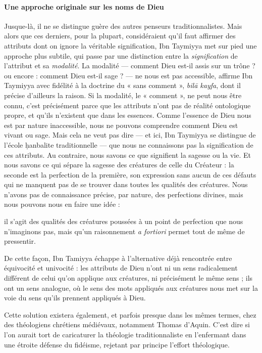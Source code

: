 \paragraph{Une approche originale sur les noms de Dieu}Jusque-là, il ne se distingue guère des autres penseurs
traditionnalistes. Mais alors que ces derniers, pour la plupart,
considéraient qu'il faut affirmer des attributs dont on ignore la
véritable signification, Ibn Taymiyya met sur pied une approche plus
subtile, qui passe par une distinction entre la \emph{signification} de
l'attribut et sa \emph{modalité}. La modalité --- comment Dieu est-il
assis sur un trône ? ou encore : comment Dieu est-il sage ? --- ne nous
est pas accessible, affirme Ibn Taymiyya avec fidélité à la doctrine du
« sans comment », \emph{bilā kayfa}, dont il précise d'ailleurs la
raison. Si la modalité, le « comment », ne peut nous être connu, c'est
précisément parce que les attributs n'ont pas de réalité ontologique
propre, et qu'ils n'existent que dans les essences. Comme l'essence de
Dieu nous est par nature inaccessible, nous ne pouvons comprendre
comment Dieu est vivant ou sage. Mais cela ne veut pas dire --- et ici,
Ibn Taymiyya se distingue de l'école ḥanbalite traditionnelle --- que
nous ne connaissons pas la signification de ces attributs. Au contraire,
nous savons ce que signifient la sagesse ou la vie. Et nous savons ce
qui sépare la sagesse des créatures de celle du Créateur : la seconde
est la perfection de la première, son expression sans aucun de ces
défauts qui ne manquent pas de se trouver dans toutes les qualités des
créatures. Nous n'avons pas de connaissance précise, par nature, des
perfections divines, mais nous pouvons nous en faire une idée : 
\begin{Synthesis}
il
s'agit des qualités des créatures poussées à un point de perfection que
nous n'imaginons pas, mais qu'un raisonnement \emph{a fortiori} permet
tout de même de pressentir.


De cette façon, Ibn Tamiyya échappe à l'alternative déjà rencontrée
entre équivocité et univocité : les attributs de Dieu n'ont ni un sens
radicalement différent de celui qu'on applique aux créatures, ni
précisément le même sens ; ils ont un sens analogue, où le sens des mots
appliqués aux créatures nous met sur la voie du sens qu'ils prennent
appliqués à Dieu.
\end{Synthesis}
Cette solution existera également, et parfois presque
dans les mêmes termes, chez des
théologiens chrétiens médiévaux, notamment Thomas d'Aquin. C'est dire si
l'on aurait tort de caricaturer la théologie traditionnaliste en
l'enfermant dans une étroite défense du fidéisme, rejetant par principe
l'effort théologique.
